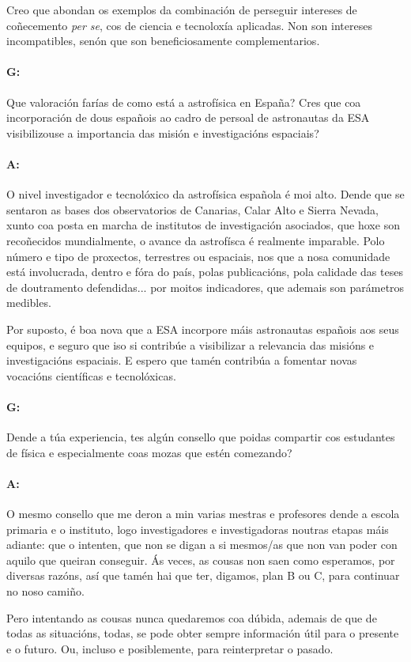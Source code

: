 \begin{refsection}
\begin{multicols}{2}
Creo que abondan os exemplos da combinación de perseguir intereses de
coñecemento \textit{per se}, cos de ciencia e tecnoloxía aplicadas. Non son
intereses incompatibles, senón que son beneficiosamente complementarios.

\paragraph{G:} Que valoración farías de como está a astrofísica en España? Cres
que coa incorporación de dous españois ao cadro de persoal de astronautas da
ESA visibilizouse a importancia das misión e investigacións espaciais?

\paragraph{A:} O nivel investigador e tecnolóxico da astrofísica española é moi
alto. Dende que se sentaron as bases dos observatorios de Canarias, Calar Alto
e Sierra Nevada, xunto coa posta en marcha de institutos de investigación
asociados, que hoxe son recoñecidos mundialmente, o avance da astrofísca é
realmente imparable. Polo número e tipo de proxectos, terrestres ou espaciais,
nos que a nosa comunidade está involucrada, dentro e fóra do país, polas
publicacións, pola calidade das teses de doutramento defendidas... por moitos
indicadores, que ademais son parámetros medibles.

Por suposto, é boa nova que a ESA incorpore máis astronautas españois aos seus
equipos, e seguro que iso si contribúe a visibilizar a relevancia das misións e
investigacións espaciais. E espero que tamén contribúa a fomentar novas
vocacións científicas e tecnolóxicas.

\paragraph{G:} Dende a túa experiencia, tes algún consello que poidas compartir
cos estudantes de física e especialmente coas mozas que estén comezando?

\paragraph{A:} O mesmo consello que me deron a min varias mestras e profesores
dende a escola primaria e o instituto, logo investigadores e investigadoras
noutras etapas máis adiante: que o intenten, que non se digan a si mesmos/as
que non van poder con aquilo que queiran conseguir. Ás veces, as cousas non
saen como esperamos, por diversas razóns, así que tamén hai que ter, digamos,
plan B ou C, para continuar no noso camiño.

Pero intentando as cousas nunca quedaremos coa dúbida, ademais de que de todas
as situacións, todas, se pode obter sempre información útil para o presente e o
futuro. Ou, incluso e posiblemente, para reinterpretar o pasado.

\end{multicols}
\end{refsection}
